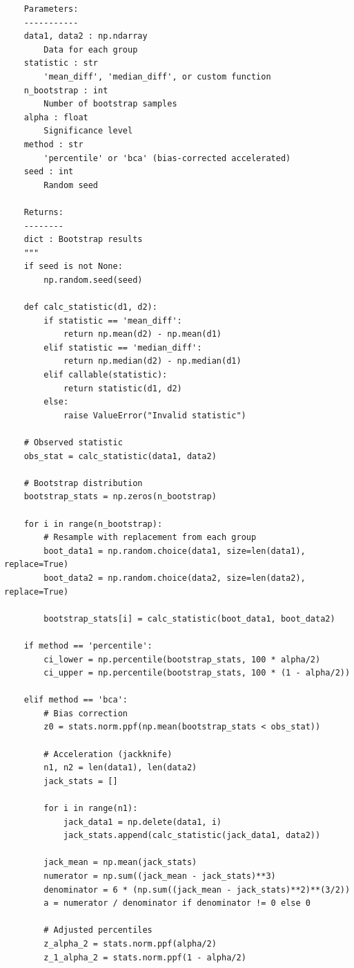 \begin{lstlisting}
    Parameters:
    -----------
    data1, data2 : np.ndarray
        Data for each group
    statistic : str
        'mean_diff', 'median_diff', or custom function
    n_bootstrap : int
        Number of bootstrap samples
    alpha : float
        Significance level
    method : str
        'percentile' or 'bca' (bias-corrected accelerated)
    seed : int
        Random seed

    Returns:
    --------
    dict : Bootstrap results
    """
    if seed is not None:
        np.random.seed(seed)

    def calc_statistic(d1, d2):
        if statistic == 'mean_diff':
            return np.mean(d2) - np.mean(d1)
        elif statistic == 'median_diff':
            return np.median(d2) - np.median(d1)
        elif callable(statistic):
            return statistic(d1, d2)
        else:
            raise ValueError("Invalid statistic")

    # Observed statistic
    obs_stat = calc_statistic(data1, data2)

    # Bootstrap distribution
    bootstrap_stats = np.zeros(n_bootstrap)

    for i in range(n_bootstrap):
        # Resample with replacement from each group
        boot_data1 = np.random.choice(data1, size=len(data1), replace=True)
        boot_data2 = np.random.choice(data2, size=len(data2), replace=True)

        bootstrap_stats[i] = calc_statistic(boot_data1, boot_data2)

    if method == 'percentile':
        ci_lower = np.percentile(bootstrap_stats, 100 * alpha/2)
        ci_upper = np.percentile(bootstrap_stats, 100 * (1 - alpha/2))

    elif method == 'bca':
        # Bias correction
        z0 = stats.norm.ppf(np.mean(bootstrap_stats < obs_stat))

        # Acceleration (jackknife)
        n1, n2 = len(data1), len(data2)
        jack_stats = []

        for i in range(n1):
            jack_data1 = np.delete(data1, i)
            jack_stats.append(calc_statistic(jack_data1, data2))

        jack_mean = np.mean(jack_stats)
        numerator = np.sum((jack_mean - jack_stats)**3)
        denominator = 6 * (np.sum((jack_mean - jack_stats)**2)**(3/2))
        a = numerator / denominator if denominator != 0 else 0

        # Adjusted percentiles
        z_alpha_2 = stats.norm.ppf(alpha/2)
        z_1_alpha_2 = stats.norm.ppf(1 - alpha/2)


\end{lstlisting}

